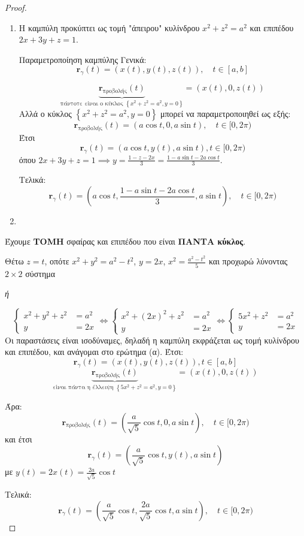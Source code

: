 \documentclass[11pt,a4paper,titlepage,draft]{article}
\begin{document}
\begin{proof}

\begin{enumerate}
\item Η καμπύλη προκύπτει ως τομή "άπειρου" κυλίνδρου \(x^2+z^2=a^2\) και επιπέδου \(2x+3y+z=1\).
\begin{infobox}{Παραμετροποίηση καμπύλης}
Γενικά:
\[
\mathbf r_\gamma(t) = \left( x(t), y(t), z(t) \right), \quad t \in [a,b]
\]
\end{infobox}
\[
 \underbrace{\mathbf r_\text{προβολής}(t)}_{\text{πάντοτε είναι ο κύκλος } 
  \left\lbrace x^2+z^2=a^2,y=0  \right\rbrace} = \left( x(t), 0 , z(t) \right)
\]
Αλλά ο κύκλος \( \left\lbrace  x^2+z^2=a^2,y=0  \right\rbrace \) μπορεί να παραμετροποιηθεί ως εξής:
\[\mathbf r_\text{προβολής}(t) = \left( a \cos t, 0 , a \sin t \right), \quad t \in [0, 2\pi)\]
Έτσι
\[
 \mathbf r_\gamma(t) = \left( a \cos t, y(t), a \sin t \right), t \in [0, 2\pi)
\]
όπου \(2x+3y+z=1 \implies y = \frac{1-z-2x}{3} = \frac{1-a \sin t -2 a \cos t}{3}\).

Τελικά:
\[
 \mathbf r_\gamma(t) = \left( a \cos t, \frac{1-a \sin t - 2 a \cos t}{3}, a \sin t \right), \quad t \in [0, 2\pi)
\]


\item 
\end{enumerate}

Έχουμε \textbf{ΤΟΜΗ} σφαίρας και επιπέδου που είναι \textbf{ΠΑΝΤΑ κύκλος}.

Θέτω \(z=t\), οπότε \(x^2+y^2=a^2-t^2\), \(y=2x\), \(x^2=\frac{a^2-t^2}{5}\) και προχωρώ λύνοντας \(2 \times 2\) σύστημα

\emph{ή}

\[
\begin{cases}
x^2+y^2+z^2&=a^2 \\
y&=2x
\end{cases}
\iff
\begin{cases}
x^2+(2x)^2+z^2&=a^2 \\
y&=2x
\end{cases}
\iff
\begin{cases}
5x^2+z^2&=a^2 \\
y&=2x
\end{cases}
\]
Οι παραστάσεις είναι ισοδύναμες, δηλαδή η καμπύλη εκφράζεται ως τομή κυλίνδρου και επιπέδου, και ανάγομαι στο ερώτημα (α). Έτσι:
\[
 \mathbf r_\gamma(t) = \left( x(t),y(t),z(t) \right), t \in [a,b]
\]
\[
 \underbrace{\mathbf r_\text{προβολής}(t)}_{\text{είναι πάντα η έλλειψη } 
  \left\lbrace 5x^2+z^2=a^2,y=0  \right\rbrace} = \left( x(t), 0 , z(t) \right)
\]

Άρα:
\[
\mathbf r_\text{προβολής}(t) = \left( \frac{a}{\sqrt{5}} \cos t,0,a \sin t \right),\quad t \in [0,2\pi)
\]
και έτσι
\[
 \mathbf r_\gamma(t) =  \left( \frac{a}{\sqrt{5}} \cos t,y(t),a \sin t \right)
 \] με \(y(t)=2x(t)=\frac{2a}{\sqrt 5} \cos t\)
 
Τελικά:
\[
 \mathbf r_\gamma(t) = \left( \frac{a}{\sqrt 5} \cos t, \frac{2a}{\sqrt 5} \cos t, a \sin t \right), \quad t \in [0, 2\pi)
\]
\end{proof}
\end{document}
